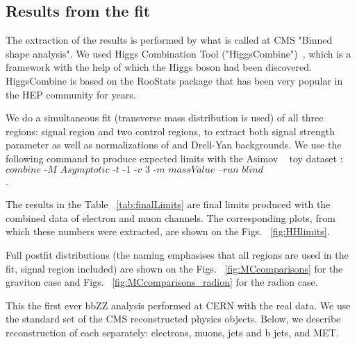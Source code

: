  
\subsection{Results from the fit}


The extraction of the results is performed by what is called at CMS "Binned shape analysis". We used Higgs Combination Tool ("HiggsCombine")~\cite{HiggsCombine}, which is a framework with the help of which the Higgs boson had been discovered. HiggsCombine is based on the RooStats package that has been very popular in the HEP community for years. 

We do a simultaneous fit (\mTHH transverse mass distribution is used) of all three
regions: signal region and two control regions, to extract both
signal strength parameter as well as normalizations of \ttbar and
Drell-Yan backgrounds. We use the following command to produce expected limits with the Asimov ~\cite{Cowan:2010js} toy dataset :  \hfill \break
$\textit{combine 
-M Asymptotic -t -1 -v 3 -m massValue --run blind
comb\_card\_massValue.txt}$.





The results in the Table ~\ref{tab:finalLimits} are final limits produced with the combined data of electron and muon channels. The corresponding plots, from which these numbers were extracted, are shown on the Figs. ~\ref{fig:HHlimits}. %

Full postfit distributions (the naming emphasises that all regions are used in the fit, signal region included) are shown on the Figs. ~\ref{fig:MCcomparisons} for the graviton case and Figs. ~\ref{fig:MCcomparisons_radion} for the radion case. 





This the first ever bbZZ analysis performed at CERN with the real data. We use the standard set of the CMS
reconstructed physics objects. Below, we describe reconstruction of
each separately: electrons, muons, jets and b jets, and MET.



